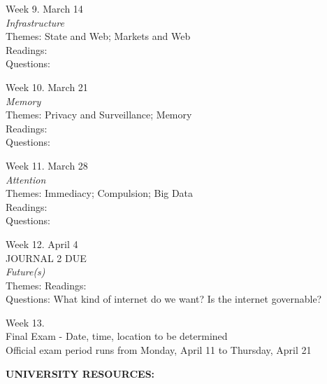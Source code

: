 \documentclass[10pt]{article}
\begin{document}
Week 9. March 14 \\
\textit{Infrastructure} \\
Themes: State and Web; Markets and Web \\
Readings: \\
Questions:

Week 10. March 21 \\
\textit{Memory} \\
Themes: Privacy and Surveillance; Memory \\
Readings: \\
Questions: 

Week 11. March 28 \\
\textit{Attention} \\
Themes: Immediacy; Compulsion; Big Data \\
Readings: \\
Questions: 

Week 12. April 4 \\
JOURNAL 2 DUE \\
\textit{Future(s)} \\
Themes: %
Readings: \\
Questions: What kind of internet do we want? Is the internet governable?

Week 13. \\
Final Exam - Date, time, location to be determined \\
Official exam period runs from Monday, April 11 to Thursday, April 21     

\textbf{UNIVERSITY RESOURCES:}
\end{document}
